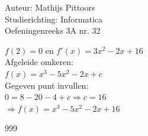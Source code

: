 \documentclass[a4paper]{article}
\begin{document}
  
\noindent \large Auteur: Mathijs Pittoors \\
\noindent \large Studierichting: Informatica\\
\noindent \large Oefeningenreeks 3A nr. 32\\

\medskip

\normalsize

$f(2) = 0$ en $f'(x) = 3x^2 - 2x + 16$\\

Afgeleide omkeren:\\

$f(x) = x^3 - 5x^2 - 2x + c$\\

Gegeven punt invullen:\\

$0 = 8 - 20 - 4 + c \Rightarrow c = 16$\\

$\Rightarrow f(x) = x^3 - 5x^2 - 2x + 16$

\begin{thebibliography}{999}
\end{thebibliography}
\end{document}
